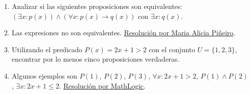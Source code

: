 \documentclass[a4paper]{article}
\newcommand{\answer}{\item[**]}
\newcommand{\then}{\to}
\begin{document}
\begin{enumerate}
\begin{enumerate} [label=(\alph*)]
		\item Analizar si las siguientes proposiciones son equivalentes: $\left(\exists x: p(x)\right) \land \left( \forall x: p(x) \then q(x) \right)$ con $\exists x: q(x)$.
		\answer Las expresiones no son equivalentes. \href{https://youtu.be/WC7P8FMIHFw}{Resolución por Maria Alicia Piñeiro}.

		\item Utilizando el predicado $P(x) = 2x+1 >2$ con el conjunto $U=\{1,2,3\}$, encontrar por lo menos cinco proposiciones verdaderas.
		\answer Algunos ejemplos son $P(1)$, $P(2)$, $P(3)$, $\forall x: 2x+1>2$, $P(1) \land P(2)$, $\exists x: 2x+1 \leq 2$. \href{https://youtu.be/rnaCiSpVtP4?t=633}{Resolución por MathLogic}.

	\end{enumerate}

	

\end{enumerate}
\end{document}
